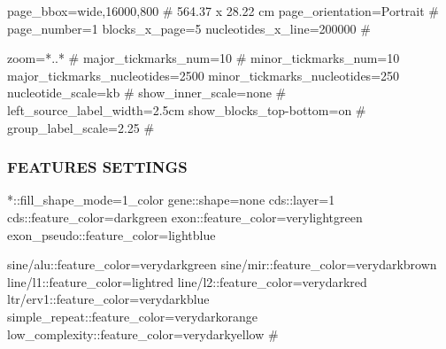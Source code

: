 \documentclass[11pt]{article}
\def\nwendcode{\endtrivlist \endgroup} %
\let\nwdocspar=\par                    %
\newcommand{\subsubsctn}[1]{\subsubsection{#1}}
\begin{document}
\nwenddocs{}\endmoddef
page_bbox=wide,16000,800 # 564.37 x 28.22 cm
page_orientation=Portrait
# page_number=1
blocks_x_page=5
nucleotides_x_line=200000
#
\nwendcode{}\nwdocspar

\nwenddocs{}\endmoddef
zoom=*..*
# major_tickmarks_num=10
# minor_tickmarks_num=10
major_tickmarks_nucleotides=2500
minor_tickmarks_nucleotides=250
nucleotide_scale=kb
#
show_inner_scale=none
#
left_source_label_width=2.5cm
show_blocks_top-bottom=on
#
group_label_scale=2.25
#
\nwendcode{}\nwdocspar

\subsubsctn{FEATURES SETTINGS}

\nwenddocs{}\endmoddef
*::fill_shape_mode=1_color
gene::shape=none
cds::layer=1
cds::feature_color=darkgreen
exon::feature_color=verylightgreen
exon_pseudo::feature_color=lightblue
\nwendcode{}\nwdocspar

\nwenddocs{}%
%
%
\nwdocspar

\nwenddocs{}\endmoddef
sine/alu::feature_color=verydarkgreen
sine/mir::feature_color=verydarkbrown
line/l1::feature_color=lightred
line/l2::feature_color=verydarkred
ltr/erv1::feature_color=verydarkblue
simple_repeat::feature_color=verydarkorange
low_complexity::feature_color=verydarkyellow
#
\nwendcode{}\nwdocspar
\end{document}
